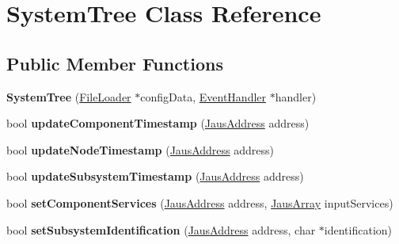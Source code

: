 \hypertarget{class_system_tree}{\section{\-System\-Tree \-Class \-Reference}
\label{class_system_tree}
}
\subsection*{\-Public \-Member \-Functions}
\begin{DoxyCompactItemize}
\item 
\hypertarget{class_system_tree_aa722e5a2342f6edd19a25ecb8f8bbc9a}{{\bfseries \-System\-Tree} (\hyperlink{class_file_loader}{\-File\-Loader} $\ast$config\-Data, \hyperlink{class_event_handler}{\-Event\-Handler} $\ast$handler)}\label{class_system_tree_aa722e5a2342f6edd19a25ecb8f8bbc9a}

\item 
\hypertarget{class_system_tree_a363bc09be59697bfafff38a72146f115}{bool {\bfseries update\-Component\-Timestamp} (\hyperlink{struct_jaus_address_struct}{\-Jaus\-Address} address)}\label{class_system_tree_a363bc09be59697bfafff38a72146f115}

\item 
\hypertarget{class_system_tree_a8eab31a9abb4aef1eaf86634cd854899}{bool {\bfseries update\-Node\-Timestamp} (\hyperlink{struct_jaus_address_struct}{\-Jaus\-Address} address)}\label{class_system_tree_a8eab31a9abb4aef1eaf86634cd854899}

\item 
\hypertarget{class_system_tree_afa6baa577590b83e234fe8cc54b8ca04}{bool {\bfseries update\-Subsystem\-Timestamp} (\hyperlink{struct_jaus_address_struct}{\-Jaus\-Address} address)}\label{class_system_tree_afa6baa577590b83e234fe8cc54b8ca04}

\item 
\hypertarget{class_system_tree_a016d3e567fe56cbe63d4869dcea64361}{bool {\bfseries set\-Component\-Services} (\hyperlink{struct_jaus_address_struct}{\-Jaus\-Address} address, \hyperlink{struct_jaus_array_struct}{\-Jaus\-Array} input\-Services)}\label{class_system_tree_a016d3e567fe56cbe63d4869dcea64361}

\item 
\hypertarget{class_system_tree_ac93c804d5b74c4e0175bb7dbe031a272}{bool {\bfseries set\-Subsystem\-Identification} (\hyperlink{struct_jaus_address_struct}{\-Jaus\-Address} address, char $\ast$identification)}\label{class_system_tree_ac93c804d5b74c4e0175bb7dbe031a272}


\end{DoxyCompactItemize}
